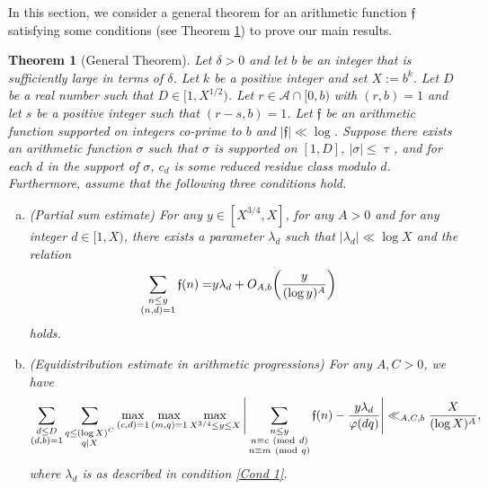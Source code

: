 \documentclass[12pt]{amsart}
\numberwithin{equation}{section}
\newtheorem{thm}{Theorem}
\theoremstyle{remark}
\theoremstyle{definition}
\newcommand{\imod}[1]{\ (\mathrm{mod}\ #1)}
\begin{document}
In this section, we consider a general theorem for an arithmetic function $\mathfrak{f}$ satisfying some conditions (see Theorem \ref{Thm G}) to prove our main results.











\begin{thm}[General Theorem]\label{Thm G}
Let $\delta>0$ and let $b$ be an integer that is sufficiently large in terms of $\delta$. Let $k$ be a positive integer and set $X:=b^k$. Let $D$ be a real number such that $D\in [1, X^{1/2})$. Let $r\in \mathcal{A}\cap [0, b)$ with $(r, b)=1$ and let $s$ be a positive integer such that $(r-s, b)=1$. Let $\mathfrak{f}$ be an arithmetic function supported on integers co-prime to $b$ and $|\mathfrak{f}|\ll \log $. Suppose there exists an arithmetic function ${\sigma}$ such that ${\sigma}$ is supported on $[1, D]$, $|{\sigma}|\leq \uptau$, and
for each $d$ in the support of ${\sigma}$, $c_d$ is some reduced residue class modulo $d$. Furthermore, assume that the following three conditions hold.
\begin{enumerate}[(a)]
\item \label{Cond 1} (Partial sum estimate) For any $y\in [X^{3/4}, X]$, for any $A>0$ and for any integer $d \in [1, X)$, there exists a parameter $\lambda_d$ such that $|\lambda_d|\ll \log X$ and the relation
\begin{align}
\notag \sum_{\substack{n\leq y\\(n, d)=1}}\mathfrak{f}(n)= &y\lambda_{ d} + O_{A, b}\bigg(\dfrac{y}{(\log y)^A}\bigg)
\end{align}
holds.
\item  \label{Cond 2} (Equidistribution estimate in arithmetic progressions)  For any $A, C>0$, we have 
\begin{align}
\notag \sum_{\substack{d\leq D\\(d, b)=1}}\sum_{\substack{q\leq (\log X)^{C}\\q|X}}\max_{(c, d)=1}\max_{(m, q)=1}\max_{X^{3/4}\leq y \leq X}\Bigg|\sum_{\substack{n\leq y\\n\equiv c\imod d\\ n\equiv m\imod q }}\mathfrak{f}(n)-\dfrac{ y\lambda_{d}}{\varphi(dq)}\Bigg| \ll_{A, C, b} \dfrac{X}{(\log X)^A},
\end{align}
where $\lambda_d$ is as described in condition \ref{Cond 1}.


\end{enumerate}
\end{thm}
\end{document}
